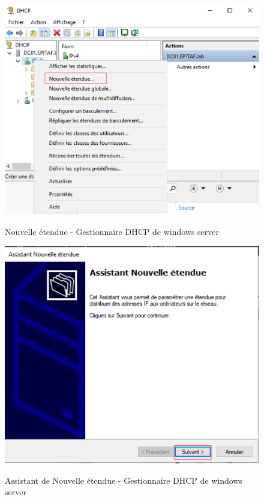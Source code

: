 \begin{figure}[h!]
	\begin{center}
		\caption{Nouvelle étendue - Gestionnaire DHCP de windows server}
		\includegraphics[scale=0.7]{WS_Screenshots/37.png}
		\label{Funcs_WinS/9}
	\end{center}
\end{figure}
\FloatBarrier 
    

\begin{figure}[h!]
	\begin{center}
		\caption{Assistant de Nouvelle étendue - Gestionnaire DHCP de windows server}
		\includegraphics[scale=0.7]{WS_Screenshots/38.png}
		\label{Funcs_WinS/10}
	\end{center}
\end{figure}
\FloatBarrier 
    

